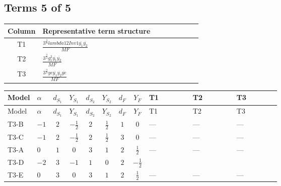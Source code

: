 \documentclass[8pt]{article}
\begin{document}
\begin{landscape}
\subsection*{Terms 5 of 5}
\begin{center}
\begin{tabular}{@{}c >{\raggedright\arraybackslash}p{0.82\linewidth}@{}}
\toprule
Column & Representative term structure \\
\midrule
T1 & \(\displaystyle \frac{3^{\frac{3}{4}} lambda12Inv1 \overline{y_{1}} \overline{y_{2}}}{MF}\) \\
\midrule
T2 & \(\displaystyle \frac{3^{\frac{3}{4}} g_{1}^{2} \overline{y_{1}} \overline{y_{2}}}{MF}\) \\
\midrule
T3 & \(\displaystyle \frac{3^{\frac{3}{4}} ye \overline{y_{1}} \overline{y_{2}} \overline{ye}}{MF}\) \\
\midrule
\bottomrule
\end{tabular}
\end{center}
\smallskip
\tiny
\begin{longtable}{@{}llcccccc >{\raggedright\arraybackslash}p{0.21\linewidth} >{\raggedright\arraybackslash}p{0.21\linewidth} >{\raggedright\arraybackslash}p{0.21\linewidth}@{}}
\toprule
Model & $\alpha$ & $d_{S_1}$ & $Y_{S_1}$ & $d_{S_2}$ & $Y_{S_2}$ & $d_F$ & $Y_F$ & T1 & T2 & T3 \\
\midrule
\endfirsthead
\toprule
Model & $\alpha$ & $d_{S_1}$ & $Y_{S_1}$ & $d_{S_2}$ & $Y_{S_2}$ & $d_F$ & $Y_F$ & T1 & T2 & T3 \\
\midrule
\endhead
T3-B & $-1$ & $2$ & $-\frac{1}{2}$ & $2$ & $\frac{1}{2}$ & $1$ & $0$ & --- & --- & --- \\
\midrule
T3-C & $-1$ & $2$ & $-\frac{1}{2}$ & $2$ & $\frac{1}{2}$ & $3$ & $0$ & --- & --- & --- \\
\midrule
T3-A & $0$ & $1$ & $0$ & $3$ & $1$ & $2$ & $\frac{1}{2}$ & --- & --- & --- \\
\midrule
T3-D & $-2$ & $3$ & $-1$ & $1$ & $0$ & $2$ & $-\frac{1}{2}$ & \scriptsize\adjustbox{max width=\linewidth}{$\begin{gathered} - \frac{3^{\frac{3}{4}} lambda12Inv1 \overline{y_{1}} \overline{y_{2}}}{6 MF}\end{gathered}$} & \scriptsize\adjustbox{max width=\linewidth}{$\begin{gathered} - \frac{3^{\frac{3}{4}} g_{1}^{2} \overline{y_{1}} \overline{y_{2}}}{8 MF}\end{gathered}$} & \scriptsize\adjustbox{max width=\linewidth}{$\begin{gathered} \frac{3^{\frac{3}{4}} ye \overline{y_{1}} \overline{y_{2}} \overline{ye}}{12 MF}\end{gathered}$} \\
\midrule
T3-E & $0$ & $3$ & $0$ & $3$ & $1$ & $2$ & $\frac{1}{2}$ & --- & --- & --- \\
\midrule
\bottomrule
\end{longtable}
\clearpage

\end{landscape}
\end{document}
